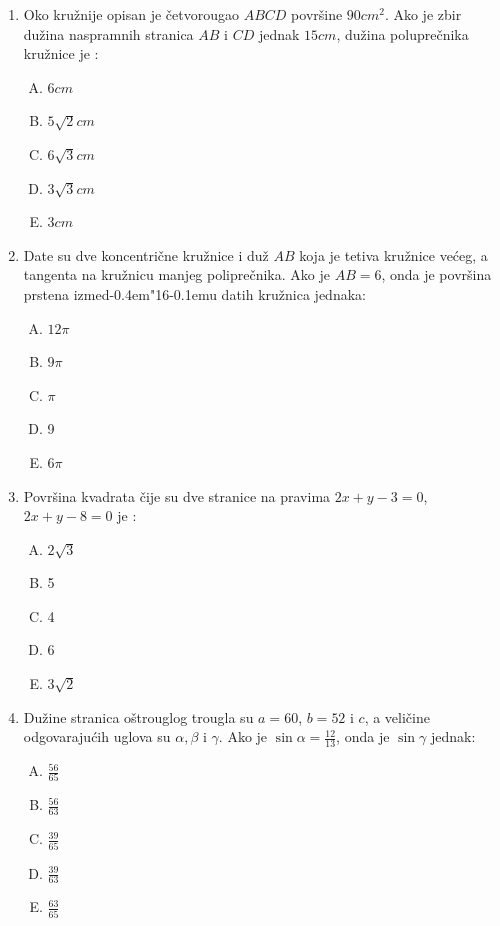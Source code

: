 \documentclass[a4paper,12pt]{report}
\def\dj{d\kern-0.4em\char"16\kern-0.1em}
\begin{document}
\begin{enumerate}[1.]
\item Oko kru\v{z}nije opisan je \v{c}etvorougao $ABCD$ povr\v{s}ine $90cm^2$. Ako je zbir du\v{z}ina naspramnih stranica $AB$ i $CD$ jednak $15cm$, du\v{z}ina polupre\v{c}nika kru\v{z}nice je : 
\begin{multicols}{5}
\begin{enumerate}[A)]
\item $6cm$ \item $5\sqrt{2}cm$ \item $6\sqrt{3}cm$ \item $3\sqrt{3}cm$ \item $3cm$
\end{enumerate}
\end{multicols}

\item Date su dve koncentri\v{c}ne kru\v{z}nice i du\v{z} $AB$ koja je tetiva kru\v{z}nice ve\'{c}eg, a tangenta na kru\v{z}nicu manjeg polipre\v{c}nika. Ako je $AB = 6$, onda je povr\v{s}ina prstena izme\dj{}u datih kru\v{z}nica jednaka: 
\begin{multicols}{5}
\begin{enumerate}[A)]
\item $12\pi$  \item $9\pi$ \item $\pi$ \item 9 \item $6\pi$
\end{enumerate}
\end{multicols}

\item Povr\v{s}ina kvadrata \v{c}ije su dve stranice na pravima $2x + y - 3 = 0$, $2x +y -8 = 0$ je :
\begin{multicols}{5}
\begin{enumerate}[A)]
\item $2\sqrt{3}$  \item 5 \item 4 \item 6 \item $3\sqrt{2}$
\end{enumerate}
\end{multicols}

\item Du\v{z}ine stranica o\v{s}trouglog trougla su $a = 60$, $ b = 52$ i $c$, a veli\v{c}ine odgovaraju\'{c}ih uglova su $\alpha,\beta  $ i $\gamma $. Ako je $\sin{\alpha } = \frac{12}{13}$, onda je $\sin{\gamma }$ jednak:
\begin{multicols}{5}
\begin{enumerate}[A)]
\item $\frac{56}{65}$  \item $\frac{56}{63}$ \item $\frac{39}{65}$ \item $\frac{39}{63}$ \item $\frac{63}{65}$
\end{enumerate}
\end{multicols}

\end{enumerate}
\end{document}
